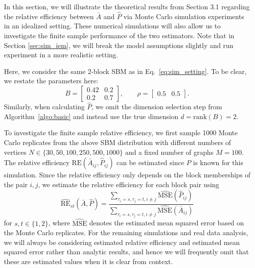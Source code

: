 \documentclass[10pt,letterpaper]{article}
\renewcommand{\hat}{\widehat}
\begin{document}
In this section, we will illustrate the theoretical results from Section 3.1 regarding the relative efficiency between $\bar{A}$ and $\hat{P}$ via Monte Carlo simulation experiments in an idealized setting.
These numerical simulations will also allow us to investigate the finite sample performance of the two estimators.
Note that in Section \ref{sec:sim_iem}, we will break the model assumptions slightly and run experiment in a more realistic setting.

Here, we consider the same 2-block SBM as in Eq.~\ref{eq:sim_setting}. To be clear, we restate the parameters here:
\begin{equation*}
B = \begin{bmatrix}
0.42 & 0.2 \\
0.2 & 0.7
\end{bmatrix}
,\qquad \rho = \begin{bmatrix}
0.5 & 0.5
\end{bmatrix}.
\end{equation*}
Similarly, when calculating $\hat{P}$, we omit the dimension selection step from Algorithm~\ref{algo:basic} and instead use the true dimension $d = \mathrm{rank}(B) = 2$.

To investigate the finite sample relative efficiency, we first sample 1000 Monte Carlo replicates from the above SBM distribution with different numbers of vertices $N \in \{30, 50, 100, 250, 500, 1000 \}$ and a fixed number of graphs $M = 100$. The relative efficiency $\mathrm{RE}(\bar{A}_{ij}, \hat{P}_{ij})$ can be estimated since $P$ is known for this simulation. Since the relative efficiency only depends on the block memberships of the pair $i,j$, we estimate the relative efficiency for each block pair using
\[
    \hat{\mathrm{RE}}_{st}(\bar{A},\hat{P}) = \frac{\sum_{\tau_i=s,\tau_j=t,i \ne j} \hat{\mathrm{MSE}}(\hat{P}_{ij})}{\sum_{\tau_i=s,\tau_j=t,i \ne j} \hat{\mathrm{MSE}}(\bar{A}_{ij})}
\]
for $s,t\in\{1,2\}$, where $\hat{\mathrm{MSE}}$ denotes the estimated mean squared error based on the Monte Carlo replicates.
For the remaining simulations and real data analysis, we will always be considering estimated relative efficiency and estimated mean squared error rather than analytic results, and hence we will frequently omit that these are estimated values when it is clear from context.
\end{document}
